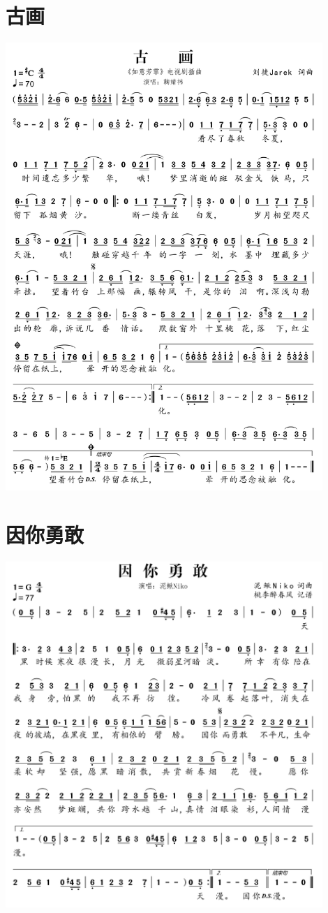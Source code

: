 \documentclass[cn,pad,twocol]{elegantbook}
\begin{document}
\section{古画} \includegraphics[width=0.9\textwidth]{rpi400/20210212古画.png}
\section{因你勇敢} \includegraphics[width=0.9\textwidth]{rpi400/20210212因你勇敢.png}
\end{document}
